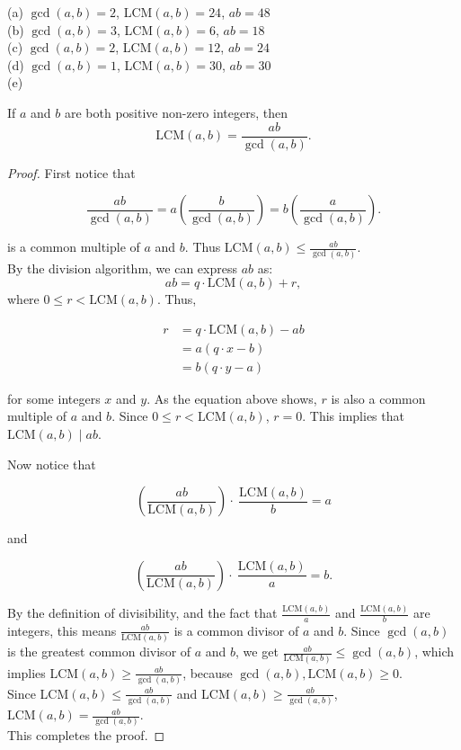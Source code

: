 \documentclass{article}
\begin{document}
(a) $\gcd(a,b)=2$, LCM$(a,b)=24$, $ab=48$\\
(b) $\gcd(a,b)=3$, LCM$(a,b)=6$, $ab=18$\\
(c) $\gcd(a,b)=2$, LCM$(a,b)=12$, $ab=24$\\
(d) $\gcd(a,b)=1$, LCM$(a,b)=30$, $ab=30$\\
(e)

\begin{conjecture}{}
    If $a$ and $b$ are both positive non-zero integers, then 
    \[\text{LCM}(a,b)=\frac{ab}{\gcd(a,b)}.\]
\end{conjecture}

\newpage

\begin{proof}
    First notice that 

    \[\frac{ab}{\gcd(a,b)} = a(\frac{b}{\gcd(a,b)})=b(\frac{a}{\gcd(a,b)}).\]

    \noindent is a common multiple of $a$ and $b$. Thus LCM$(a,b) \leq \frac{ab}{\gcd(a,b)}$. \\   

    \noindent By the division algorithm, we can express $ab$ as:
    \[
    ab = q \cdot \text{LCM}(a, b) + r,
    \]
    where $0 \leq r < \text{LCM}(a, b)$. Thus,
    
    \begin{align*}
        r&= q \cdot \text{LCM}(a, b) - ab \\
        &= a(q \cdot x - b)\\
        &= b(q \cdot y - a)
    \end{align*}

    for some integers $x$ and $y$. As the equation above shows, $r$ is also a common multiple of $a$ and $b$. Since $0 \leq r < \text{LCM}(a, b)$, $r=0$. This implies that $\text{LCM}(a, b) \mid ab$.
    
    Now notice that

    \[(\frac{ab}{\text{LCM}(a,b)})\cdot\ \frac{\text{LCM}(a,b)}{b} = a\]

    and 

    \[(\frac{ab}{\text{LCM}(a,b)}) \cdot\ \frac{\text{LCM}(a,b)}{a} = b.\]

    By the definition of divisibility, and the fact that $\frac{\text{LCM}(a,b)}{a}$ and $\frac{\text{LCM}(a,b)}{b}$ are integers, this means $\frac{ab}{\text{LCM}(a,b)}$ is a common divisor of $a$ and $b$. 
    Since $\gcd(a,b)$ is the greatest common divisor of $a$ and $b$, we get $\frac{ab}{\text{LCM}(a,b)} \leq \gcd(a,b)$, which implies  LCM$(a,b) \geq \frac{ab}{\gcd(a,b)}$, because $\gcd(a,b),\text{LCM}(a,b) \geq 0$.\\

    \noindent Since LCM$(a,b) \leq \frac{ab}{\gcd(a,b)}$ and  LCM$(a,b) \geq \frac{ab}{\gcd(a,b)}$, $\text{LCM}(a,b)=\frac{ab}{\gcd(a,b)}$.    \\
    This completes the proof.
\end{proof}
\end{document}
